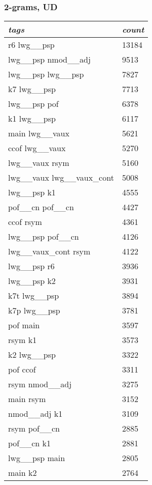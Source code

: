 \documentclass[a4 paper]{article}
\begin{document}
\subsubsection{2-grams, UD}
\begin{longtable}{p{}p{}}
    \toprule
    \textit{tags} & \textit{count}\\
    \toprule
r6 lwg\_\_psp  & 13184 \\ \midrule
lwg\_\_psp nmod\_\_adj  & 9513 \\ \midrule
lwg\_\_psp lwg\_\_psp  & 7827 \\ \midrule
k7 lwg\_\_psp  & 7713 \\ \midrule
lwg\_\_psp pof  & 6378 \\ \midrule
k1 lwg\_\_psp  & 6117 \\ \midrule
main lwg\_\_vaux  & 5621 \\ \midrule
ccof lwg\_\_vaux  & 5270 \\ \midrule
lwg\_\_vaux rsym  & 5160 \\ \midrule
lwg\_\_vaux lwg\_\_vaux\_cont  & 5008 \\ \midrule
lwg\_\_psp k1  & 4555 \\ \midrule
pof\_\_cn pof\_\_cn  & 4427 \\ \midrule
ccof rsym  & 4361 \\ \midrule
lwg\_\_psp pof\_\_cn  & 4126 \\ \midrule
lwg\_\_vaux\_cont rsym  & 4122 \\ \midrule
lwg\_\_psp r6  & 3936 \\ \midrule
lwg\_\_psp k2  & 3931 \\ \midrule
k7t lwg\_\_psp  & 3894 \\ \midrule
k7p lwg\_\_psp  & 3781 \\ \midrule
pof main  & 3597 \\ \midrule
rsym k1  & 3573 \\ \midrule
k2 lwg\_\_psp  & 3322 \\ \midrule
pof ccof  & 3311 \\ \midrule
rsym nmod\_\_adj  & 3275 \\ \midrule
main rsym  & 3152 \\ \midrule
nmod\_\_adj k1  & 3109 \\ \midrule
rsym pof\_\_cn  & 2885 \\ \midrule
pof\_\_cn k1  & 2881 \\ \midrule
lwg\_\_psp main  & 2805 \\ \midrule
main k2  & 2764 \\ \midrule

\end{longtable}
\end{document}
